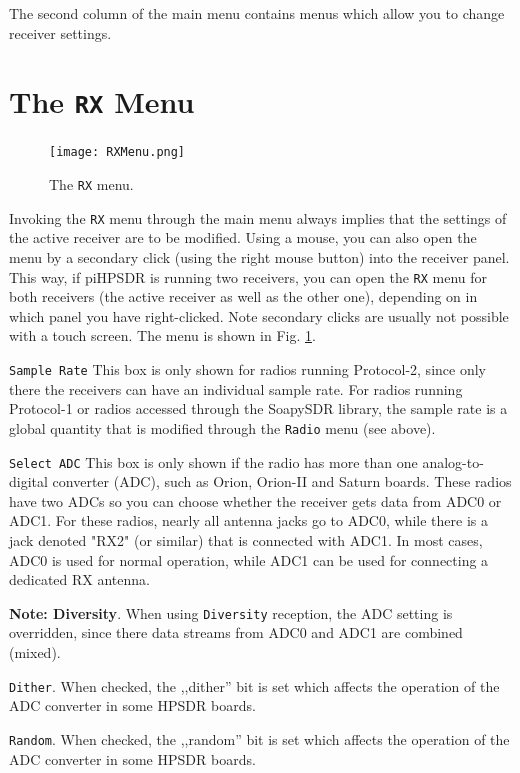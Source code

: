 \documentclass[12pt]{book}
\def\rett#1{\texttt{\color{red}#1}}
\def\bltt#1{\texttt{\color{blue}#1}}
\def\pH{pi\-HPSDR\xspace}
\begin{document}
The second column of the main menu contains menus which allow you to change
receiver settings.

\section{The \texttt{RX} Menu}

\begin{figure}[ht!]
\center
\texttt{[image: RXMenu.png]}
\caption{The \bltt{RX} menu.}
\label{fig:RXMenu}
\end{figure}

Invoking the \bltt{RX} menu through the main menu always implies that the settings
of the active receiver are to be modified. Using a mouse, you can also open the menu
by a secondary click (using the right mouse button) into the receiver panel. This way,
if \pH is running two receivers, you can open the \bltt{RX} menu for both receivers
(the active receiver as well as the other one), depending on in which panel you have
right-clicked. Note secondary clicks are usually not possible with a touch screen.
The menu is shown in Fig. \ref{fig:RXMenu}.

\rett{Sample Rate} This box is only shown for radios running Protocol-2, since only there the
receivers can have an individual sample rate. For radios running Protocol-1 or radios accessed
through the SoapySDR library, the sample rate is a global quantity that is modified
through the \bltt{Radio} menu (see above).

\rett{Select ADC} This box is only shown if the radio has more than one analog-to-digital
converter (ADC), such as Orion, Orion-II and Saturn boards. These radios have two ADCs so
you can choose whether the receiver gets data from ADC0 or ADC1. For these radios, nearly
all antenna jacks go to ADC0, while there is a jack denoted "RX2" (or similar) that
is connected with ADC1. In most cases, ADC0 is used for normal operation, while ADC1
can be used for connecting a dedicated RX antenna.

\textbf{Note: Diversity}. When using \bltt{Diversity} reception, the ADC setting is
overridden, since there data streams from ADC0 and ADC1 are combined (mixed).

\rett{Dither}. When checked, the ,,dither'' bit is set which affects the operation of
the ADC converter in some HPSDR boards.

\rett{Random}. When checked, the ,,random'' bit is set which affects the operation of
the ADC converter in some HPSDR boards.
\end{document}
